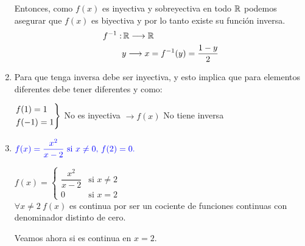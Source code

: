 \begin{enumerate}[label=\color{red}\textbf{\arabic*)}, leftmargin=*]
\begin{minipage}{0.5\textwidth}
	\end{minipage}\qquad\begin{minipage}{0.4\textwidth}
	\end{minipage}
	
	Entonces, como $f(x)$ es inyectiva y sobreyectiva en todo $\operatorname{\mathbb{R}}$ podemos asegurar que $f(x)$ es biyectiva y por lo tanto existe su función inversa. \[ \begin{aligned}
		f^{-1}:&\operatorname{\mathbb{R}}\longrightarrow\operatorname{\mathbb{R}}\\
		&y\longrightarrow x=f^{-1}(y)=\dfrac{1-y}{2}
	\end{aligned} \]
	
\item {}

Para que tenga inversa debe ser inyectiva, y esto implica que para elementos diferentes debe tener diferentes y como: 
\begin{center}
	$\begin{rcases}
		f(1)=1\\
		f(-1)=1
	\end{rcases}$ No es inyectiva $\longrightarrow f(x)$ No tiene inversa
\end{center}
\item {}

$\textcolor{blue}{f(x)=\dfrac{x^2}{x-2}\text{ si }x\neq0,\, f(2)=0.}$

$f(x)=\begin{cases}
	\dfrac{x^2}{x-2} & \text{si }x\neq2\\
	0 & \text{si }x=2
\end{cases}$\\
$\forall x\neq2\:f(x)$ es continua por ser un cociente de funciones continuas con denominador distinto de cero.

Veamos ahora si es continua en $x=2$.


\end{enumerate}
